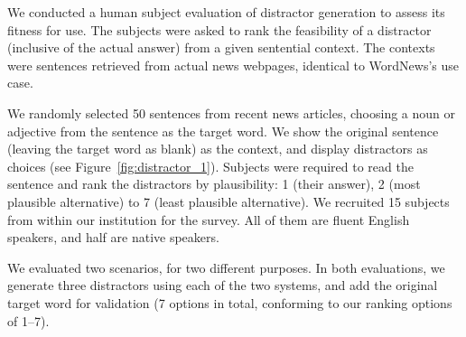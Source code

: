 



We conducted a human subject evaluation of distractor generation to
assess its fitness for use.  The subjects were asked to rank the
feasibility of a distractor (inclusive of the actual answer) from a
given sentential context.  The contexts were sentences retrieved from
actual news webpages, identical to WordNews's use case.

We randomly selected 50 sentences from recent news articles, choosing
a noun or adjective from the sentence as the target word. We show the
original sentence (leaving the target word as blank) as the context,
and display distractors as choices (see
Figure~\ref{fig:distractor_1}). Subjects were required to read the
sentence and rank the distractors by plausibility: 1 (their answer), 2
(most plausible alternative) to 7 (least plausible alternative).
We recruited 15 subjects from within our institution for the survey. 
All of them are fluent English speakers, and half are native speakers.  
 
We evaluated two scenarios, for two different purposes. In both
evaluations, we generate three distractors using each of the two systems,
and add the original target word for validation (7 options in total,
conforming to our ranking options of 1--7).


